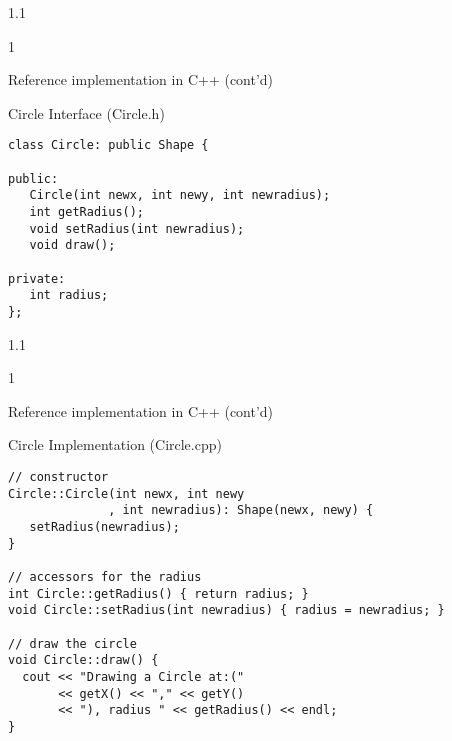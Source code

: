 \documentclass{slides}
\newenvironment{myslide}{\begin{slide}\color{Blue}\begin{boxedminipage}{1.1\hsize}\begin{boxedminipage}{1\hsize}\color{Black}
\vspace{-170\in}
}{%
\smallskip
\end{boxedminipage}
\end{boxedminipage}
\end{slide}}
\newenvironment{myslide}{\begin{slide}
}{%
\end{slide}}
\newenvironment{myslide}{\begin{slide}\color{White}\begin{boxedminipage}{1.1\hsize}\color{Black}
\vspace{-170\in}
}{%
\smallskip
\end{boxedminipage}
\end{slide}}
\newcommand{\header}[1]{{\large \color{Red} #1}}
\begin{document}



\begin{myslide}

\header{Reference implementation in C++ (cont'd)}

Circle Interface (Circle.h)

{\tiny

\begin{verbatim}
class Circle: public Shape {

public:
   Circle(int newx, int newy, int newradius);
   int getRadius();
   void setRadius(int newradius);
   void draw();

private:
   int radius;
};
\end{verbatim}

}

\end{myslide}






\begin{myslide}

\header{Reference implementation in C++ (cont'd)}

Circle Implementation (Circle.cpp)

{\tiny

\begin{verbatim}
// constructor
Circle::Circle(int newx, int newy
              , int newradius): Shape(newx, newy) {
   setRadius(newradius);
}

// accessors for the radius
int Circle::getRadius() { return radius; }
void Circle::setRadius(int newradius) { radius = newradius; }

// draw the circle
void Circle::draw() {
  cout << "Drawing a Circle at:("
       << getX() << "," << getY()
       << "), radius " << getRadius() << endl;
}
\end{verbatim}

}

\end{myslide}



\end{document}

